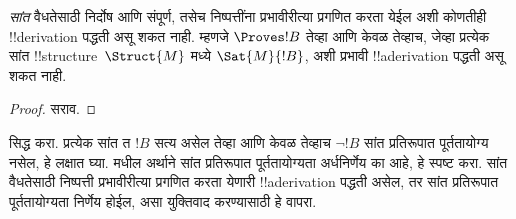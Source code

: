 \documentclass[../../../include/open-logic-section]{subfiles}
\begin{document}
\begin{cor}%
  \emph{सांत} वैधतेसाठी
  निर्दोष आणि संपूर्ण, तसेच निष्पत्तींना
  प्रभावीरीत्या प्रगणित करता येईल अशी
  कोणतीही !!{derivation} पद्धती असू शकत नाही.
  म्हणजे $\Proves !B$ तेव्हा आणि केवळ तेव्हाच,
  जेव्हा प्रत्येक सांत !!{structure}~$\Struct{M}$ मध्ये $\Sat{M}{!B}$,
  अशी प्रभावी !!a{derivation}
  पद्धती असू शकत नाही.
%
\end{cor}

\begin{proof}
  सराव.
\end{proof}

\begin{prob}
  सिद्ध करा. प्रत्येक
  सांत त $!B$ सत्य
  असेल तेव्हा आणि केवळ तेव्हाच
  $\lnot !B$ सांत प्रतिरूपात
  पूर्ततायोग्य नसेल,
  हे लक्षात घ्या.
  मधील अर्थाने सांत
  प्रतिरूपात पूर्ततायोग्यता अर्धनिर्णेय
  का आहे, हे स्पष्ट
  करा. सांत वैधतेसाठी
  निष्पत्ती प्रभावीरीत्या प्रगणित करता येणारी
  !!a{derivation} पद्धती
  असेल, तर सांत
  प्रतिरूपात पूर्ततायोग्यता निर्णेय
  होईल, असा युक्तिवाद
  करण्यासाठी हे वापरा.
\end{prob}
\end{document}
